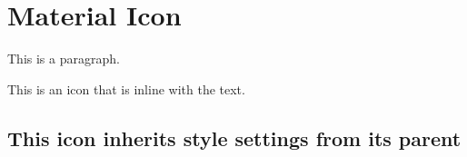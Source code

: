 
\chapter{\label{material-icon}Material Icon}
\par This is a paragraph.
\par {}
\par This is an icon  that is inline with the text.
\section{\label{this-icon-inherits-style-settings-from-its-parent}This icon  inherits style settings from its parent}
